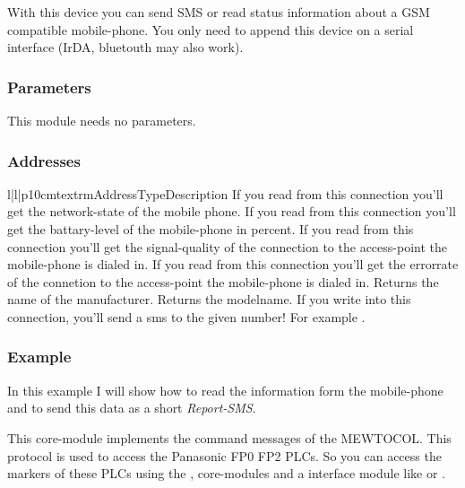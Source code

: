 %
%



%
%
With this device you can send SMS or read status information about a GSM 
compatible mobile-phone. You only need to append this device on a serial
interface (IrDA, bluetouth may also work).

\subsubsection{Parameters}
This module needs no parameters.

\subsubsection{Addresses}
\begin{tableiii}{l|l|p{10cm}}{textrm}{Address}{Type}{Description}
        {If you read from this connection you'll get the network-state of
         the mobile phone.}
        {If you read from this connection you'll get the battary-level of
         the mobile-phone in percent.}
        {If you read from this connection you'll get the signal-quality of
         the connection to the access-point the mobile-phone is dialed in.}
        {If you read from this connection you'll get the errorrate of the
         connetion to the access-point the mobile-phone is dialed in.}
        {Returns the name of the manufacturer.}
        {Returns the modelname.}
        {If you write into this connection, you'll send a sms to the given 
         number! For example .}
\end{tableiii}

\subsubsection{Example}
In this example I will show how to read the information form the mobile-phone 
and to send this data as a short \emph{Report-SMS}.


%
%
This core-module implements the command messages of the MEWTOCOL. This 
protocol is used to access the Panasonic FP0 FP2 PLCs. So you can access
the markers of these PLCs using the ,
 core-modules and a interface module like 
 or .

